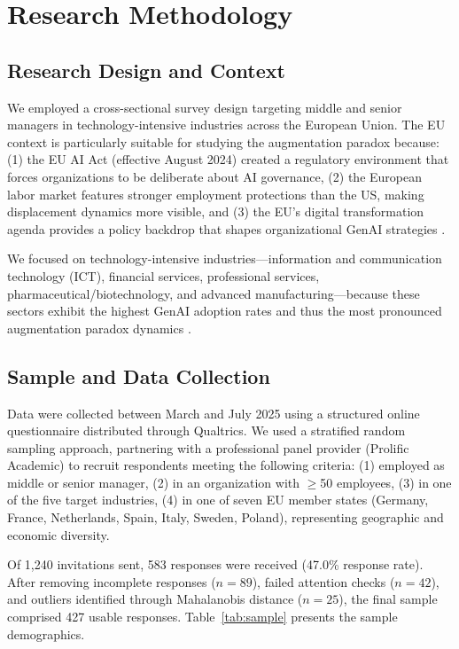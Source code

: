 \documentclass[12pt, a4paper]{article}
\begin{document}
\section{Research Methodology}

\subsection{Research Design and Context}

We employed a cross-sectional survey design targeting middle and senior managers in technology-intensive industries across the European Union. The EU context is particularly suitable for studying the augmentation paradox because: (1) the EU AI Act (effective August 2024) created a regulatory environment that forces organizations to be deliberate about AI governance, (2) the European labor market features stronger employment protections than the US, making displacement dynamics more visible, and (3) the EU's digital transformation agenda provides a policy backdrop that shapes organizational GenAI strategies \citep{EuropeanCommission2024}.

We focused on technology-intensive industries---information and communication technology (ICT), financial services, professional services, pharmaceutical/biotechnology, and advanced manufacturing---because these sectors exhibit the highest GenAI adoption rates and thus the most pronounced augmentation paradox dynamics \citep{McKinsey2025}.

\subsection{Sample and Data Collection}

Data were collected between March and July 2025 using a structured online questionnaire distributed through Qualtrics. We used a stratified random sampling approach, partnering with a professional panel provider (Prolific Academic) to recruit respondents meeting the following criteria: (1) employed as middle or senior manager, (2) in an organization with $\geq$50 employees, (3) in one of the five target industries, (4) in one of seven EU member states (Germany, France, Netherlands, Spain, Italy, Sweden, Poland), representing geographic and economic diversity.

Of 1,240 invitations sent, 583 responses were received (47.0\% response rate). After removing incomplete responses ($n = 89$), failed attention checks ($n = 42$), and outliers identified through Mahalanobis distance ($n = 25$), the final sample comprised 427 usable responses. Table~\ref{tab:sample} presents the sample demographics.
\end{document}

